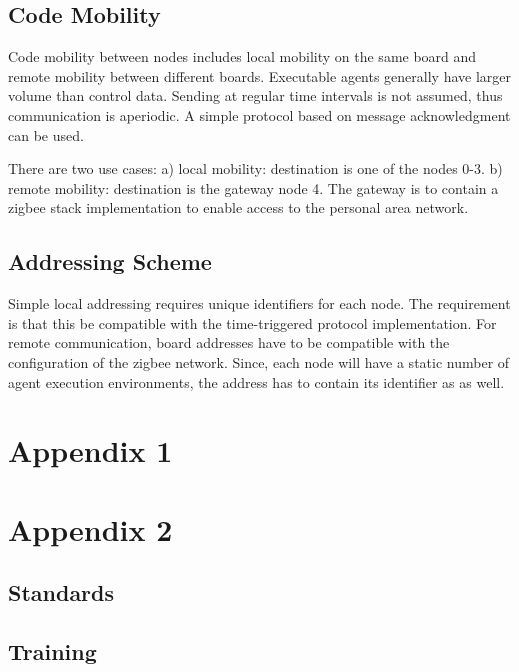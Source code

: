 \documentclass{scrreprt}
\begin{document}
\section{Code Mobility}
Code mobility between nodes includes local mobility on the same board and
remote mobility between different boards. Executable agents generally have
larger volume than control data. Sending at regular time intervals is not assumed,
thus communication is aperiodic.
A simple protocol based on message acknowledgment can be used. 

There are two use cases: a) local mobility: destination is one of the nodes 0-3.
b) remote mobility: destination is the gateway node 4. 
The gateway is to contain a zigbee stack implementation to enable 
access to the personal area network.


\section{Addressing Scheme}
Simple local addressing requires unique identifiers for
each node. The requirement is that this be compatible with the time-triggered protocol
implementation. For remote communication, board addresses have to be compatible
with the configuration of the zigbee network. Since, each node will have a static 
number of agent execution environments, the address has to contain its
identifier as as well.  



\chapter{Appendix 1}
\chapter{Appendix 2}

	\section{Standards}
	\section{Training}

\end{document}
